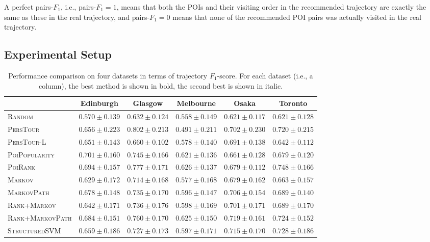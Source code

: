 A perfect pairs-$F_1$, i.e., pairs-$F_1 = 1$, means that both the POIs and their visiting order in the
recommended trajectory are exactly the same as these in the real trajectory,
and pairs-$F_1 = 0$ means that none of the recommended POI pairs was actually visited in the real trajectory.


\subsection{Experimental Setup}
\label{sec:setup}

\begin{table}[t]
\caption{Performance comparison on four datasets in terms of trajectory $F_1$-score.
         For each dataset (i.e., a column), the best method is shown in bold, the second best is shown in italic.}
\label{tab:f1}
\centering
\begin{tabular}{l|ccccc} \hline
 & Edinburgh & Glasgow & Melbourne & Osaka & Toronto \\ \hline
\textsc{Random} & $0.570\pm0.139$ & $0.632\pm0.124$ & $0.558\pm0.149$ & $0.621\pm0.117$ & $0.621\pm0.128$ \\
\textsc{PersTour}\cite{ijcai15} & $0.656\pm0.223$ & $\mathbf{0.802\pm0.213}$ & $0.491\pm0.211$ & $0.702\pm0.230$ & $0.720\pm0.215$ \\
\textsc{PersTour-L} & $0.651\pm0.143$ & $0.660\pm0.102$ & $0.578\pm0.140$ & $0.691\pm0.138$ & $0.642\pm0.112$ \\
\textsc{PoiPopularity} & $\mathbf{0.701\pm0.160}$ & $0.745\pm0.166$ & $0.621\pm0.136$ & $0.661\pm0.128$ & $0.679\pm0.120$ \\
\textsc{PoiRank} & $\mathit{0.694\pm0.157}$ & $\mathit{0.777\pm0.171}$ & $\mathbf{0.626\pm0.137}$ & $0.679\pm0.112$ & $\mathbf{0.748\pm0.166}$ \\
\textsc{Markov} & $0.629\pm0.172$ & $0.714\pm0.168$ & $0.577\pm0.168$ & $0.679\pm0.162$ & $0.663\pm0.157$ \\
\textsc{MarkovPath} & $0.678\pm0.148$ & $0.735\pm0.170$ & $0.596\pm0.147$ & $0.706\pm0.154$ & $0.689\pm0.140$ \\
\textsc{Rank+Markov} & $0.642\pm0.171$ & $0.736\pm0.176$ & $0.598\pm0.169$ & $0.701\pm0.171$ & $0.689\pm0.170$ \\
\textsc{Rank+MarkovPath} & $0.684\pm0.151$ & $0.760\pm0.170$ & $\mathit{0.625\pm0.150}$ & $\mathbf{0.719\pm0.161}$ & $0.724\pm0.152$ \\
\textsc{StructuredSVM} & $0.659\pm0.186$ & $0.727\pm0.173$ & $0.597\pm0.171$ & $\mathit{0.715\pm0.170}$ & $\mathit{0.728\pm0.186}$ \\
\hline
\end{tabular}
\end{table}


